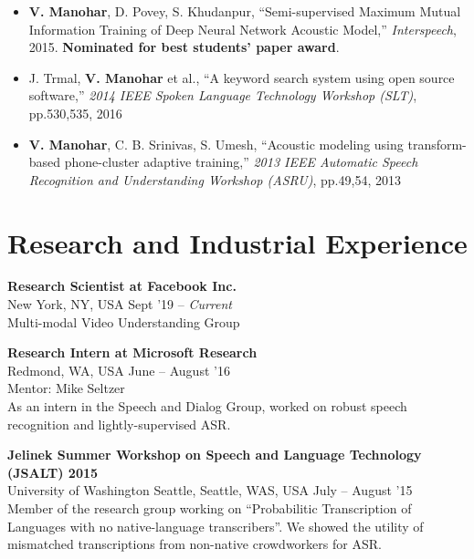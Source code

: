 \documentclass[margin,line,pifont,palatino,courier]{res}
\begin{document}
\begin{resume}
\begin{itemize}
  \item
    \textbf{V. Manohar}, D. Povey, S. Khudanpur,
    ``Semi-supervised Maximum Mutual Information Training of Deep Neural
    Network Acoustic Model,''
    \textit{Interspeech}, 2015. \textbf{Nominated for best students' paper award}.
  \item
    J. Trmal, \textbf{V. Manohar} et al.,
    ``A keyword search system using open source software,''
    \textit{2014 IEEE Spoken Language Technology Workshop (SLT)}, pp.530,535, 2016
  \item
    \textbf{V. Manohar}, C. B. Srinivas, S. Umesh,
    ``Acoustic modeling
    using transform-based phone-cluster adaptive training,''
    \textit{2013 IEEE Automatic Speech Recognition and Understanding Workshop (ASRU)}, pp.49,54, 2013
\end{itemize}

\section{\sc Research and Industrial Experience}

\textbf{Research Scientist at Facebook Inc.} \\
New York, NY, USA \hfill Sept '19 -- \textit{Current} \\
Multi-modal Video Understanding Group


\textbf{Research Intern at Microsoft Research} \\
Redmond, WA, USA \hfill
June -- August '16 \vspace{2pt} \\
Mentor: Mike Seltzer \\
As an intern in the Speech and Dialog Group, worked on robust speech recognition and lightly-supervised ASR.

\textbf{Jelinek Summer Workshop on Speech and Language Technology (JSALT) 2015 } \\
University of Washington Seattle, Seattle, WAS, USA \hfill
July -- August '15 \vspace{2pt} \\
Member of the research group working on ``Probabilitic Transcription of Languages with no native-language transcribers''. We showed the utility of mismatched transcriptions from non-native crowdworkers for ASR.
\vspace{-5pt}


\end{resume}
\end{document}
